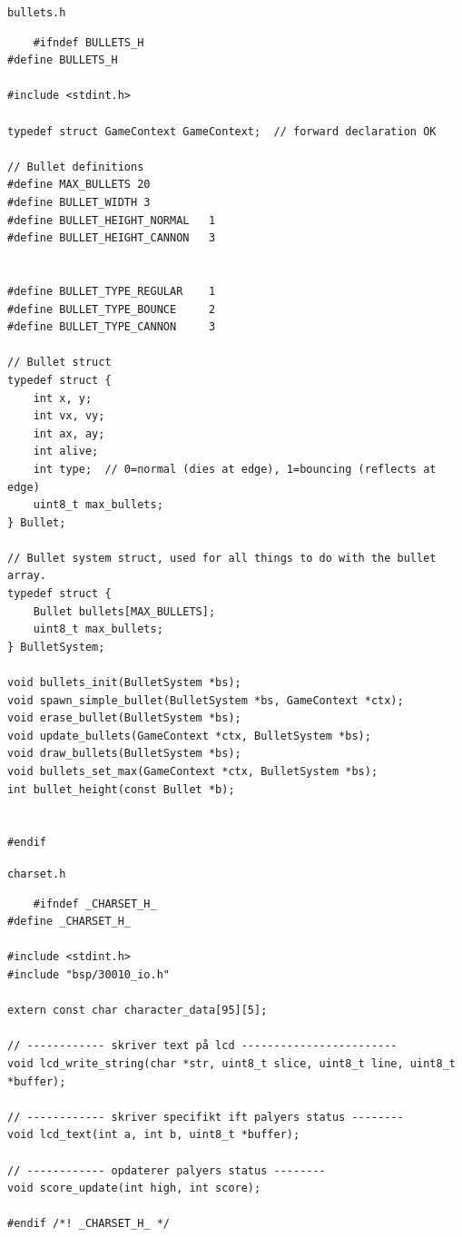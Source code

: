 \texttt{bullets.h}
\begin{lstlisting}
    #ifndef BULLETS_H
#define BULLETS_H

#include <stdint.h>

typedef struct GameContext GameContext;  // forward declaration OK

// Bullet definitions
#define MAX_BULLETS 20
#define BULLET_WIDTH 3
#define BULLET_HEIGHT_NORMAL   1
#define BULLET_HEIGHT_CANNON   3


#define BULLET_TYPE_REGULAR    1
#define BULLET_TYPE_BOUNCE     2
#define BULLET_TYPE_CANNON     3

// Bullet struct
typedef struct {
    int x, y;
    int vx, vy;
    int ax, ay;
    int alive;
    int type;  // 0=normal (dies at edge), 1=bouncing (reflects at edge)
    uint8_t max_bullets;
} Bullet;

// Bullet system struct, used for all things to do with the bullet array.
typedef struct {
    Bullet bullets[MAX_BULLETS];
    uint8_t max_bullets;
} BulletSystem;

void bullets_init(BulletSystem *bs);
void spawn_simple_bullet(BulletSystem *bs, GameContext *ctx);
void erase_bullet(BulletSystem *bs);
void update_bullets(GameContext *ctx, BulletSystem *bs);
void draw_bullets(BulletSystem *bs);
void bullets_set_max(GameContext *ctx, BulletSystem *bs);
int bullet_height(const Bullet *b);


#endif
\end{lstlisting}

\texttt{charset.h}
\begin{lstlisting}
    #ifndef _CHARSET_H_
#define _CHARSET_H_

#include <stdint.h>
#include "bsp/30010_io.h"

extern const char character_data[95][5];

// ------------ skriver text på lcd ------------------------
void lcd_write_string(char *str, uint8_t slice, uint8_t line, uint8_t *buffer);

// ------------ skriver specifikt ift palyers status --------
void lcd_text(int a, int b, uint8_t *buffer);

// ------------ opdaterer palyers status --------
void score_update(int high, int score);

#endif /*! _CHARSET_H_ */
\end{lstlisting}

